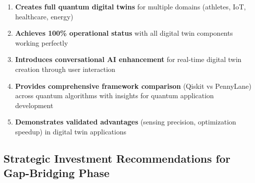 \documentclass[12pt,a4paper]{article}
\begin{document}
\begin{enumerate}
    \item \textbf{Creates full quantum digital twins} for multiple domains (athletes, IoT, healthcare, energy)
    \item \textbf{Achieves 100\% operational status} with all digital twin components working perfectly
    \item \textbf{Introduces conversational AI enhancement} for real-time digital twin creation through user interaction
    \item \textbf{Provides comprehensive framework comparison} (Qiskit vs PennyLane) across quantum algorithms with insights for quantum application development
    \item \textbf{Demonstrates validated advantages} (sensing precision, optimization speedup) in digital twin applications
\end{enumerate}

\subsection{Strategic Investment Recommendations for Gap-Bridging Phase}
\end{document}
